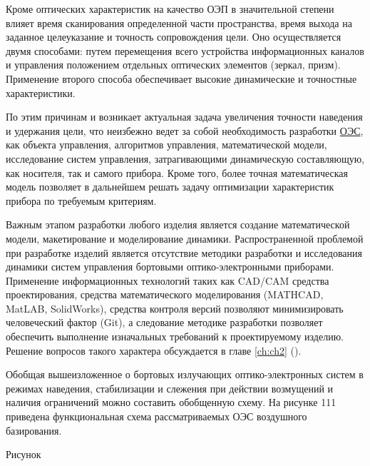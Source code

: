 \begin{comment}
Проведена оценка точности при использовании различных датчиков.Исследование влияния точности и принципа работы датчика проводится в главе \ref{ch:ch5} (\nameref{ch:ch5}).
\end{comment}

Кроме оптических характеристик на качество ОЭП в значительной степени влияет время сканирования определенной части пространства, время выхода на заданное целеуказание и точность сопровождения цели. Оно осуществляется двумя способами: путем перемещения всего устройства информационных каналов и управления положением отдельных оптических элементов (зеркал, призм). Применение второго способа обеспечивает высокие динамические и точностные характеристики. 

По этим причинам и возникает актуальная задача увеличения точности наведения и удержания цели, что неизбежно ведет за собой необходимость разработки \hyperref[acroEOS]{ОЭС}, как объекта управления, алгоритмов управления, математической модели, исследование систем управления, затрагивающими динамическую составляющую, как носителя, так и самого прибора. Кроме того, более точная математическая модель позволяет в дальнейшем решать задачу оптимизации характеристик прибора по требуемым критериям.
 
Важным этапом разработки любого изделия является создание математической модели, макетирование и моделирование динамики. Распространенной проблемой при разработке изделий является отсутствие методики разработки и исследования динамики систем управления бортовыми оптико-электронными приборами. Применение информационных технологий таких как CAD/CAM средства проектирования, средства математического моделирования (MATHCAD, MatLAB, SolidWorks), средства контроля версий позволяют минимизировать человеческий фактор (Git), а следование методике разработки позволяет обеспечить выполнение изначальных требований к проектируемому изделию. Решение вопросов такого характера обсуждается в главе \ref{ch:ch2} ().

Обобщая вышеизложенное о бортовых излучающих оптико-электронных систем в режимах наведения, стабилизации и слежения при действии возмущений и наличия  ограничений можно составить обобщенную схему. На рисунке 111 приведена функциональная схема  рассматриваемых ОЭС воздушного базирования.

Рисунок

